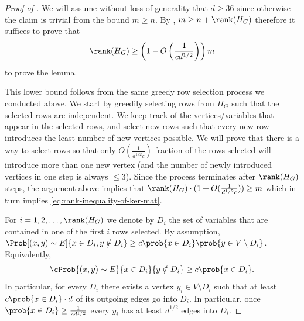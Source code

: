 \begin{proof}[Proof of ]
    We will assume without loss of generality that \(d \geq 36\) since otherwise the claim is trivial from the bound \(m\geq n\).
    By , \(m \geq n + \rank(H_G)\) therefore it suffices to prove that 
    \begin{equation}\label{eq:rank-inequality-of-ker-mat}
    \rank(H_G) \geq \left( 1-O \left(\frac{1}{c d^{1/2}} \right) \right) m
    \end{equation}
    to prove the lemma.

    This lower bound follows from the same greedy row selection process we conducted above. We start by greedily selecting rows from \(H_G\) such that the selected rows are independent. We keep track of the vertices/variables that appear in the selected rows, and select new rows such that every new row introduces the least number of new vertices possible. We will prove that there is a way to select rows so that only \(O(\frac{1}{d^{1/2}c})\) fraction of the rows selected will introduce more than one new vertex (and the number of newly introduced vertices in one step is always \(\le 3\)). Since the process terminates after \(\rank(H_G)\) steps, the argument above implies that \(\rank(H_G)\cdot (1+ O(\frac{1}{d^{1/2}c})) \geq m\) which in turn implies \eqref{eq:rank-inequality-of-ker-mat}.
    
    For \(i=1,2,\dots,\rank(H_G)\) we denote by \(D_i\) the set of variables that are contained in one of the first \(i\) rows selected. By assumption, \(\Prob[(x,y)\sim E]{x\in D_i, y \notin D_i} \ge c \prob{x\in D_i} \prob{y\in V \setminus D_i}\). Equivalently,
    \[\cProb{(x,y)\sim E}{x \in D_i}{y \notin D_i} \geq c \prob{x\in D_i}.\]
    In particular, for every \(D_i\) there exists a vertex \(y_i \in V \setminus D_i\) such that at least \(c\prob{x\in D_i} \cdot d\) of its outgoing edges go into \(D_i\). In particular, once \(\prob{x\in D_i} \geq \frac{1}{c d^{1/2}}\) every \(y_i\) has at least \(d^{1/2}\) edges into \(D_i\).


\end{proof}
